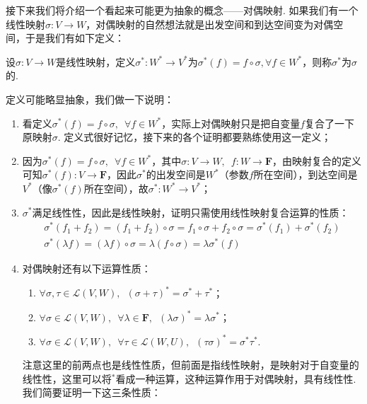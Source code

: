接下来我们将介绍一个看起来可能更为抽象的概念——对偶映射. 如果我们有一个线性映射$\sigma:V\to W$，对偶映射的自然想法就是出发空间和到达空间变为对偶空间，于是我们有如下定义：
\begin{definition}
    设$\sigma:V\to W$是线性映射，定义$\sigma^*:W^*\to V^*$为$\sigma^*(f)=f\circ\sigma,\forall f\in W^*$，则称$\sigma^*$为$\sigma$的.
\end{definition}
定义可能略显抽象，我们做一下说明：
\begin{enumerate}
    \item 看定义$\sigma^*(f)=f\circ\sigma,\enspace\forall f\in W^*$，实际上对偶映射只是把自变量$f$复合了一下原映射$\sigma$. 定义式很好记忆，接下来的各个证明都要熟练使用这一定义；

    \item 因为$\sigma^*(f)=f\circ\sigma,\enspace\forall f\in W^*$，其中$\sigma:V\to W,\enspace f:W\to\mathbf{F}$，由映射复合的定义可知$\sigma^*(f):V\to\mathbf{F}$，因此$\sigma^*$的出发空间是$W^*$（参数$f$所在空间），到达空间是$V^*$（像$\sigma^*(f)$所在空间），故$\sigma^*:W^*\to V^*$；

    \item $\sigma^*$满足线性性，因此是线性映射，证明只需使用线性映射复合运算的性质：
          \begin{gather*}
              \sigma^*(f_1+f_2)=(f_1+f_2)\circ\sigma=f_1\circ\sigma+f_2\circ\sigma=\sigma^*(f_1)+\sigma^*(f_2) \\
              \sigma^*(\lambda f)=(\lambda f)\circ\sigma=\lambda(f\circ\sigma)=\lambda\sigma^*(f)
          \end{gather*}

    \item 对偶映射还有以下运算性质：
          \begin{enumerate}
              \item $\forall\sigma,\tau\in\mathcal{L}(V,W),\enspace (\sigma+\tau)^*=\sigma^*+\tau^*$；

              \item $\forall\sigma\in\mathcal{L}(V,W),\enspace \forall\lambda\in\mathbf{F},\enspace (\lambda\sigma)^*=\lambda\sigma^*$；

              \item $\forall\sigma\in\mathcal{L}(V,W),\enspace \forall\tau\in\mathcal{L}(W,U),\enspace (\tau\sigma)^*=\sigma^*\tau^*$.
          \end{enumerate}
          注意这里的前两点也是线性性质，但前面是指线性映射，是映射对于自变量的线性性，这里可以将$^*$看成一种运算，这种运算作用于对偶映射，具有线性性. 我们简要证明一下这三条性质：


\end{enumerate}
